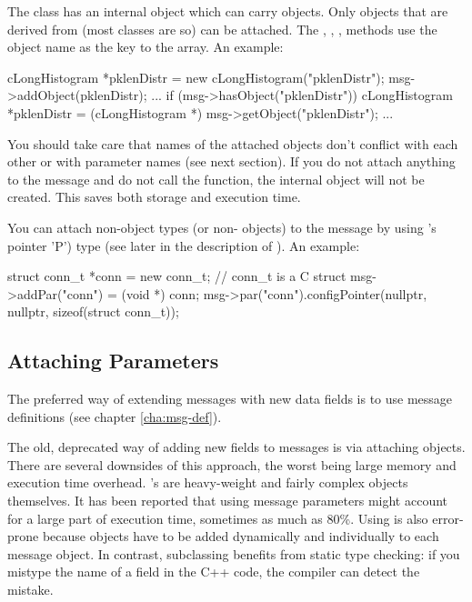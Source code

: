 The  class has an internal  object which can
carry objects. Only objects
that are derived from  (most {\opp} classes are so) can be attached.
The , , ,
 methods use the object name
as the key to the array. An example:

\begin{cpp}
cLongHistogram *pklenDistr = new cLongHistogram("pklenDistr");
msg->addObject(pklenDistr);
...
if (msg->hasObject("pklenDistr"))
{
   cLongHistogram *pklenDistr =
       (cLongHistogram *) msg->getObject("pklenDistr");
   ...
}
\end{cpp}

You should take care that names of the attached objects don't
conflict with each other or with  parameter names
(see next section).
If you do not attach anything to the message and do not call the
 function, the internal  object
will not be created. This saves both storage and execution time.

You can attach non-object types (or non- objects) to
the message by using
's  pointer 'P') type (see later in the description
of ). An example:

\begin{cpp}
struct conn_t *conn = new conn_t; // conn_t is a C struct
msg->addPar("conn") = (void *) conn;
msg->par("conn").configPointer(nullptr, nullptr, sizeof(struct conn_t));
\end{cpp}


\subsection{Attaching Parameters}
\label{sec:messages:attaching-parameters}

The preferred way of extending messages with new data fields is to use
message definitions (see chapter \ref{cha:msg-def}).

The old, deprecated way of adding new fields to messages is via
attaching  objects.
There are several downsides of this approach, the worst being
large memory and execution time overhead. 's are
heavy-weight and fairly complex objects themselves.
It has been reported that using  message parameters
might account for a large part of execution time, sometimes as much as 80\%.
Using  is also error-prone because  objects
have to be added dynamically and individually to each message object.
In contrast, subclassing benefits from static type checking:
if you mistype the name of a field in the C++ code, the compiler
can detect the mistake.

